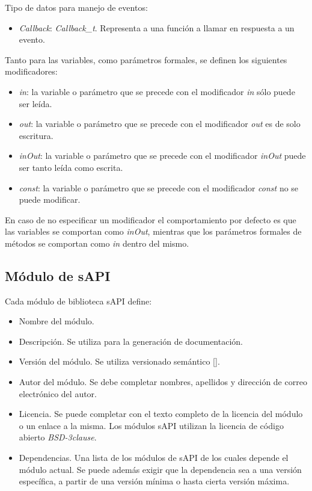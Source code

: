 Tipo de datos para manejo de eventos:

\begin{itemize}
\item
\emph{Callback}: \emph{Callback\_t}. Representa a una función a llamar en respuesta a un evento.
\end{itemize}



Tanto para las variables, como parámetros formales, se definen los siguientes modificadores:

\begin{itemize}
\item
\emph{in}: la variable o parámetro que se precede con el modificador \emph{in} sólo puede ser leída.
\item
\emph{out}: la variable o parámetro que se precede con el modificador \emph{out} es de solo escritura. 
\item
\emph{inOut}: la variable o parámetro que se precede con el modificador \emph{inOut} puede ser tanto leída como escrita.
\item
\emph{const}: la variable o parámetro que se precede con el modificador \emph{const} no se puede modificar.
\end{itemize}

En caso de no especificar un modificador el comportamiento por defecto es que las variables se comportan como \emph{inOut}, mientras que los parámetros formales de métodos se comportan como \emph{in} dentro del mismo.

\subsection{Módulo de sAPI}

Cada módulo de biblioteca sAPI define:

\begin{itemize}
\item
Nombre del módulo.
\item
Descripción. Se utiliza para la generación de documentación.
\item
Versión del módulo. Se utiliza versionado semántico [].
\item
Autor del módulo. Se debe completar nombres, apellidos y dirección de correo electrónico del autor. 
\item
Licencia. Se puede completar con el texto completo de la licencia del módulo o un enlace a la misma. Los módulos sAPI utilizan la licencia de código abierto \emph{BSD-3clause}.
\item
Dependencias. Una lista de los módulos de sAPI de los cuales depende el módulo actual. Se puede además exigir que la dependencia sea a una versión específica, a partir de una versión mínima o hasta cierta versión máxima.
\end{itemize}

